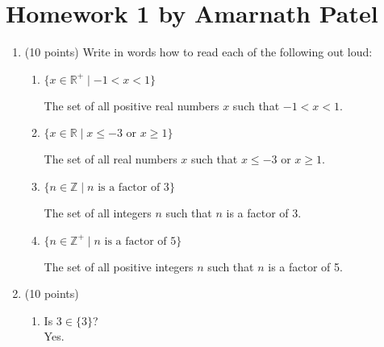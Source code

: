 \documentclass{article}
\begin{document}
\section*{Homework 1 by Amarnath Patel}

\begin{enumerate}

    \item (10 points) Write in words how to read each of the following out loud:
    \begin{enumerate}
        \item $\{x \in \mathbb{R}^+ \mid -1 < x < 1\}$
        
        \vspace{1em}
        The set of all positive real numbers \( x \) such that \( -1 < x < 1 \).
        \vspace{1em}
        
        \hrulefill
        
        \item $\{x \in \mathbb{R} \mid x \leq -3 \text{ or } x \geq 1\}$

        \vspace{1em}
        The set of all real numbers \( x \) such that \( x \leq -3 \) or \( x \geq 1 \).
        \vspace{1em}
        
        \hrulefill

        \item $\{n \in \mathbb{Z} \mid n \text{ is a factor of 3}\}$

        \vspace{1em}
        The set of all integers \( n \) such that \( n \) is a factor of 3.
        \vspace{1em}
        
        \hrulefill

        \item $\{n \in \mathbb{Z}^+ \mid n \text{ is a factor of 5}\}$

        \vspace{1em}
        The set of all positive integers \( n \) such that \( n \) is a factor of 5.
        \vspace{1em}
    \end{enumerate}
    
    \hrulefill

    \item (10 points)
    \begin{enumerate}
        \item Is $3 \in \{3\}$?\\
        \vspace{1em}
        Yes.
        \vspace{1em}
        

\end{enumerate}
\end{enumerate}
\end{document}
